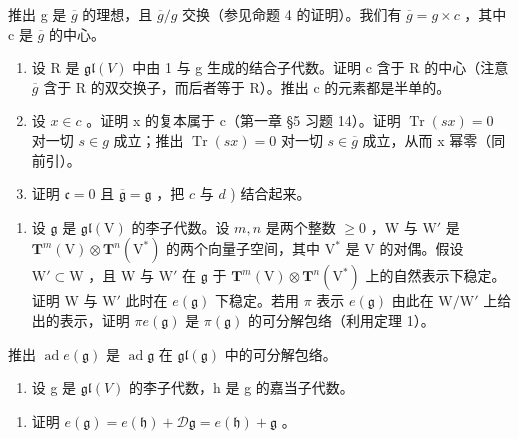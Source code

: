 推出 g 是 \(\overline{g}\) 的理想，且 \(\overline{g}/g\) 交换（参见命题 4 的证明）。我们有 \(\overline{g} = g \times c\) ，其中 c 是 \(\overline{g}\) 的中心。

\begin{enumerate}
\def\labelenumi{\alph{enumi})}
\setcounter{enumi}{2}
\item
  设 R 是 \(\mathfrak{gl}(V)\) 中由 1 与 g 生成的结合子代数。证明 c 含于 R 的中心（注意 \(\overline{g}\) 含于 R 的双交换子，而后者等于 R）。推出 c 的元素都是半单的。
\item
  设 \(x \in c\) 。证明 x 的复本属于 c（第一章 §5 习题 14）。证明 \(\operatorname{Tr}(sx) = 0\) 对一切 \(s \in g\) 成立；推出 \(\operatorname{Tr}(sx) = 0\) 对一切 \(s \in \overline{g}\) 成立，从而 x 幂零（同前引）。
\item
  证明 \(\mathfrak{c} = 0\) 且 \(\overline{\mathfrak{g}} = \mathfrak{g}\) ，把 \(c\) 与 \(d\) ) 结合起来。
\end{enumerate}

\begin{enumerate}
\def\labelenumi{\arabic{enumi})}
\setcounter{enumi}{6}
\tightlist
\item
  设 \(\mathfrak{g}\) 是 \(\mathfrak{gl}(\mathrm{V})\) 的李子代数。设 \(m, n\) 是两个整数 \(\geq 0\) ，W 与 \(\mathrm{W}'\) 是 \(\mathbf{T}^m(\mathrm{V}) \otimes \mathbf{T}^n(\mathrm{V}^*)\) 的两个向量子空间，其中 \(\mathrm{V}^*\) 是 V 的对偶。假设 \(\mathrm{W}' \subset \mathrm{W}\) ，且 W 与 \(\mathrm{W}'\) 在 \(\mathfrak{g}\) 于 \(\mathbf{T}^m(\mathrm{V}) \otimes \mathbf{T}^n(\mathrm{V}^*)\) 上的自然表示下稳定。证明 W 与 \(\mathrm{W}'\) 此时在 \(e(\mathfrak{g})\) 下稳定。若用 \(\pi\) 表示 \(e(\mathfrak{g})\) 由此在 \(\mathrm{W/W}'\) 上给出的表示，证明 \(\pi e(\mathfrak{g})\) 是 \(\pi(\mathfrak{g})\) 的可分解包络（利用定理 1）。
\end{enumerate}

推出 \(\operatorname{ad} e(\mathfrak{g})\) 是 \(\operatorname{ad} \mathfrak{g}\) 在 \(\mathfrak{gl}(\mathfrak{g})\) 中的可分解包络。

\begin{enumerate}
\def\labelenumi{\arabic{enumi})}
\setcounter{enumi}{7}
\tightlist
\item
  设 g 是 \(\mathfrak{gl}(V)\) 的李子代数，h 是 g 的嘉当子代数。
\end{enumerate}

\begin{enumerate}
\def\labelenumi{\alph{enumi})}
\tightlist
\item
  证明 \(e(\mathfrak{g}) = e(\mathfrak{h}) + \mathcal{D}\mathfrak{g} = e(\mathfrak{h}) + \mathfrak{g}\) 。
\end{enumerate}

